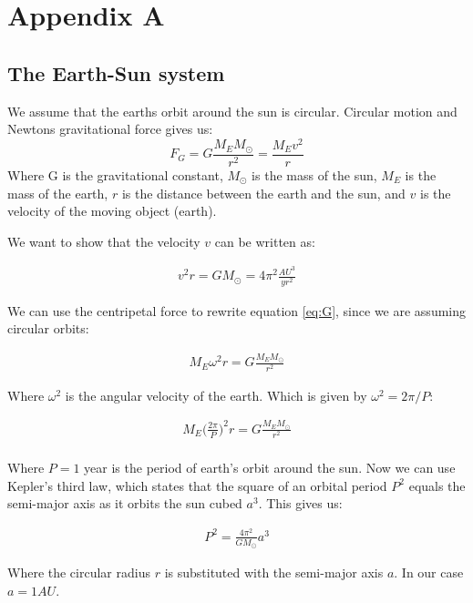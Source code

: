 \documentclass{article}
\begin{document}
\clearpage

\appendix \section{Appendix A} %
\subsection{The Earth-Sun system}
We assume that the earths orbit around the sun is circular. Circular motion and Newtons gravitational force gives us:
\begin{equation}
    F_G=G\frac{M_EM_{\odot}}{r^2}=\frac{M_Ev^2}{r}
    \label{eq:G}
\end{equation}
Where G is the gravitational constant, $M_\odot$ is the mass of the sun, $M_E$ is the mass of the earth, $r$ is the distance between the earth and the sun, and $v$ is the velocity of the moving object (earth). 

We want to show that the velocity $v$ can be written as:

\begin{align}
    v^2r=GM_{\odot}=4\pi^2\frac{AU^3}{yr^2}
    \label{eq:vr}
\end{align}

We can use the centripetal force to rewrite equation \ref{eq:G}, since we are assuming circular orbits:

\begin{align*}
    M_E\omega^2r=G\frac{M_EM_{\odot}}{r^2}
\end{align*}

Where $\omega^2$ is the angular velocity of the earth. Which is given by $\omega^2=2\pi / P$: 

\begin{align*}
    M_E\bigg(\frac{2\pi}{P}\bigg)^2r=G\frac{M_EM_{\odot}}{r^2}\\
\end{align*}

Where $P=1$ year is the period of earth's orbit around the sun.
Now we can use Kepler's third law, which states that the square of an orbital period $P^2$ equals the semi-major axis as it orbits the sun cubed $a^3$. This gives us:

\begin{align}
    P^2=\frac{4\pi^2}{GM_\odot}a^3
\end{align}

Where the circular radius $r$ is substituted with the semi-major axis $a$. In our case $a = 1AU$.  
\end{document}
